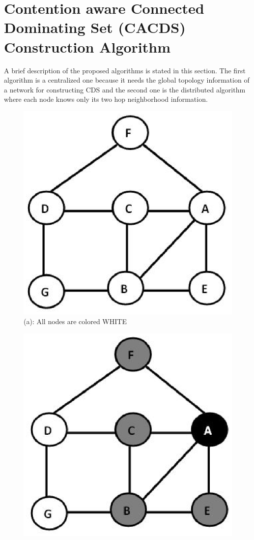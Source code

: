 \section{Contention aware Connected Dominating Set (CACDS) Construction Algorithm}
A brief description of the proposed algorithms is stated in this section. The first algorithm is a centralized one because it needs the global topology information of a network for constructing CDS and the second one is the distributed algorithm where each node knows only its two hop neighborhood information.   

\begin{figure}[h]
\begin{minipage}{.25\textwidth}
\centering
\includegraphics[width=0.9\linewidth,height=.8\linewidth]{Figures/cacds1.eps}
\\(a): All nodes are colored WHITE
\end{minipage}%
\begin{minipage}{.25\textwidth}
\centering
\includegraphics[width=0.9\linewidth,height=.8\linewidth]{Figures/cacds2.eps}

\end{minipage}
\end{figure}
